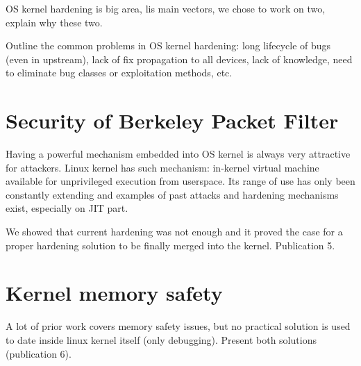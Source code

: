 OS kernel hardening is big area, lis main vectors, we chose to work on two, explain why these two. 

Outline the common problems in OS kernel hardening: long lifecycle of bugs (even in upstream), lack of fix propagation to all devices, lack of knowledge, need to eliminate bug classes or exploitation methods, etc.

\section{Security of Berkeley Packet Filter}

Having a powerful mechanism embedded into OS kernel is always very attractive for attackers. 
Linux kernel has such mechanism: in-kernel virtual machine available for unprivileged execution from userspace. 
Its range of use has only been constantly extending and examples of past attacks and hardening mechanisms exist, especially on JIT part.

We showed that current hardening was not enough and it proved the case for a proper hardening solution to be finally merged into the kernel. Publication 5. 

\section{Kernel memory safety}
A lot of prior work covers memory safety issues, but no practical solution is used to date inside linux kernel itself (only debugging).
Present both solutions (publication 6).


